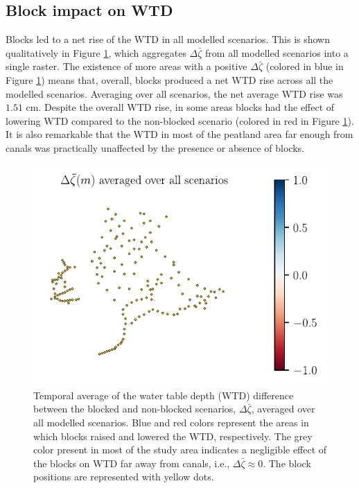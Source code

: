 \documentclass[bg, manuscript]{copernicus}
\begin{document}
\subsection{Block  impact on WTD}
Blocks led to a net rise of the WTD in all modelled scenarios.
This is shown qualitatively in Figure \ref{fig:diff_averaged_over_everything}, which aggregates  $\Delta \bar{\zeta}$ from all modelled scenarios into a single raster.
The existence of more areas with a positive $\Delta \bar{\zeta}$ (colored in blue in Figure \ref{fig:diff_averaged_over_everything}) means that, overall, blocks produced a net WTD rise across all the modelled scenarios.
Averaging over all  scenarios, the net average WTD rise was $1.51$ \unit{cm}. 
Despite the overall WTD rise, in some areas blocks had the effect of lowering WTD compared to the non-blocked scenario (colored in red in Figure \ref{fig:diff_averaged_over_everything}).
It is also remarkable that the WTD in most of the peatland area far enough from canals was practically unaffected by the presence or absence of blocks.

\begin{figure}[t]
\includegraphics[width=8.3 cm]{figs/diff_averaged_over_everything_with_blocks.pdf}
\caption{Temporal average of the water table depth (WTD) difference between the blocked and non-blocked scenarios, $\Delta \bar{\zeta}$, averaged over all modelled scenarios. Blue and red colors represent the areas in which blocks raised and lowered the WTD, respectively. The grey color present in most of the study area indicates a negligible effect of the blocks on WTD far away from canals, i.e., $\Delta \bar{\zeta} \approx 0$. The block positions are represented with yellow dots.}
\label{fig:diff_averaged_over_everything}
\end{figure}   

\end{document}
